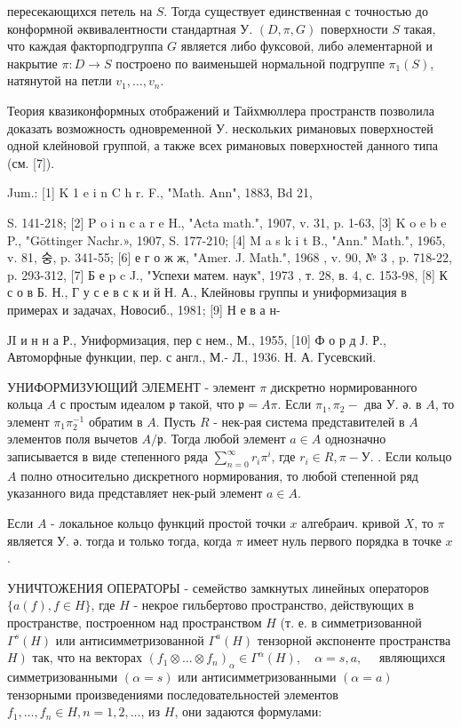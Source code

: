 \documentclass[10pt]{article}
\begin{document}
пересекающихся петель на $S$. Тогда существует единственная с точностью до конформной әквивалентности стандартная У. $(D, \pi, G)$ поверхности $S$ такая, что каждая факторподгруппа $G$ является либо фуксовоӥ, либо әлементарной и накрытие $\pi: D \rightarrow S$ построено по ваименьшей нормальной подгруппе $\pi_{1}(S)$, натянутой на петли $v_{1}, \ldots, v_{n}$.



Теория квазиконформных отображений и Тайхмюллера пространств позволила доказать возможность одновременной У. нескольких римановых поверхностей одной клейновой группой, а также всех римановых поверхностей данного типа (см. [7]).



Jum.: [1] K 1 e i n C h r. F., "Math. Ann", 1883, Bd 21,

S. 141-218; [2] P o i n c a r e H., "Acta math.", 1907, v. 31, p. 1-63, [3] K o e b e P., "Göttinger Nachr.», 1907, S. 177-210; [4] M a s k i t B., "Ann." Math.", 1965, v. 81, 숭, p. 341-55; [6] е г о ж ж, "Amer. J. Math.", 1968 , v. 90, № 3 , p. 718-22, p. 293-312, [7] Б е p c J., "Успехи матем. наук", 1973 , т. 28, в. 4, с. 153-98, [8] К с о в Б. Н., Г у с е в с к и й Н. А., Клейновы группы и униформизация в примерах и задачах, Новосиб., 1981; [9] Н е в а н-

ЈI и н н а Р., Униформизация, пер с нем., М., 1955, [10] Ф $о$ р д Ј. Р., Автоморфные функции, пер. с англ., М.- Л., 1936. Н. А. Гусевский.



УНИФОРМИЗУЮЩИЙ ЭЛЕМЕНТ - элемент $\pi$ дискретно нормированного кольца $A$ с простым идеалом $\mathfrak{p}$ такой, что $\mathfrak{p}=A \pi$. Если $\pi_{1}, \pi_{2}-$ два У. ә. в $A$, то элемент $\pi_{1} \pi_{2}^{-1}$ обратим в $A$. Пусть $R$ - нек-рая система представителей в $A$ элементов поля вычетов $A / \mathfrak{p}$. Тогда любой элемент $a \in A$ однозначно записывается в виде степенного ряда $\sum_{n=0}^{\infty} r_{i} \pi^{i}$, где $r_{i} \in R, \pi-У$. . Если кольцо $A$ полно относительно дискретного нормирования, то любой степенной ряд указанного вида представляет нек-рый элемент $a \in A$.



Если $A$ - локальное кольцо функций простой точки $x$ алгебраич. кривой $X$, то $\pi$ является $\mathscr{У}$. ә. тогда и только тогда, когда $\pi$ имеет нуль первого порядка в точке $x$.



УНИЧТОЖЕНИЯ ОПЕРАТОРЫ - семейство замкнутых линейных операторов $\{a(f), f \in H\}$, где $H$ - некрое гильбертово пространство, действующих в пространстве, построенном над пространством $H$ (т. е. в симметризованной $\Gamma^{s}(H)$ или антисимметризованной $\Gamma^{a}(H)$ тензорной әкспоненте пространства $\left.H\right)$ так, что на векторах $\left(f_{1} \otimes \ldots \otimes f_{n}\right)_{\alpha} \in \Gamma^{\alpha}(H), \quad \alpha=s, a, \quad$ являющихся симметризованными $(\alpha=s)$ или антисимметризованными $(\alpha=a)$ тензорными произведениями последовательностей элементов $f_{1}, \ldots, f_{n} \in H, n=1,2, \ldots$, из $H$, они задаются формулами:
\end{document}
